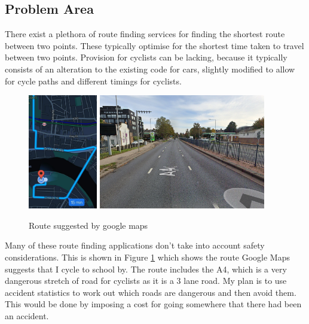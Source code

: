 \documentclass[11pt,twoside,a4paper]{article}
\begin{document}
\subsection{Problem Area}
There exist a plethora of route finding services for finding the shortest route between two points. 
These typically optimise for the shortest time taken to travel between two points.
Provision for cyclists can be lacking, because it typically consists of an alteration to the existing code for cars, slightly modified to allow for cycle paths and different timings for cyclists.\\
\begin{figure}[t]
    \begin{center}
        \includegraphics[height=5cm]{route.jpg}
    \includegraphics[height=5cm]{dangerous.png}
\end{center}
    \caption{Route suggested by google maps}
\label{route}
\end{figure}
Many of these route finding applications don't take into account safety considerations. This is shown in Figure \ref{route} which shows the route Google Maps suggests that I cycle to school by. The route includes the A4, which is a very dangerous stretch of road for cyclists as it is a 3 lane road. 
My plan is to use accident statistics to work out which roads are dangerous and then avoid them. This would be done by imposing a cost for going somewhere that there had been an accident.
\end{document}
